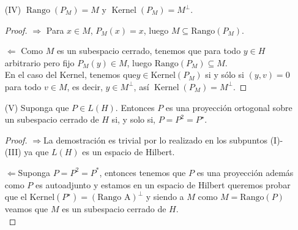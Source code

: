 \begin{itemize}
\begin{proof}
\[
x = P_M(x) + (x - P_M(x)), \quad y = P_M(y) + (y - P_M(y)),
\]
donde \( x - P_M(x) \in M^\perp \) y \( y - P_M(y) \in M^\perp \). Entonces
\begin{align*}
\langle P_M(x), y \rangle 
&= \langle P_M(x), P_M(y) + (y - P_M(y)) \rangle \\
&= \langle P_M(x), P_M(y) \rangle + \langle P_M(x), y - P_M(y) \rangle
\end{align*}
como  \( y - P_M(y) \in M^\perp \) entonces $\langle P_M(x), y - P_M(y) \rangle=0$, luego 

\begin{align*}
\langle P_M(x), P_M(y) \rangle
&= \langle P_M(x)+x-P_M(x), P_M(y)  \rangle \\
&= \langle x, P_M(y) \rangle + \
\end{align*}


Por tanto, \( P_M^* = P_M \), es decir, el operador es autoadjunto.
\end{proof}

\item[(IV)] $\operatorname{Rango}\left(P_M\right)=M$ y $\operatorname{Kernel}\left(P_M\right)=M^{\perp}$.


\begin{proof}
$\Rightarrow$ Para \( x \in M \), \( P_M(x) = x \), luego \( M \subseteq \text{Rango}(P_M) \).

$\Leftarrow$ Como $M$ es un subespacio cerrado, tenemos que para todo $y\in H$ arbitrario pero fijo $P_M(y) \in M$, luego $ \text{Rango}(P_M) \subseteq M$.\\


En el caso del Kernel, tenemos que\( y \in \text{Kernel}(P_M) \) si y sólo si \( (y, v) = 0 \) para todo \( v \in M \), es decir, \( y \in M^\perp \), así $\operatorname{Kernel}\left(P_M\right)=M^{\perp}$.

\end{proof}


\item[(V)] Suponga que $P \in L(H)$. Entonces $P$ es una proyección ortogonal sobre un subespacio cerrado de $H$ si, y solo si, $P=P^2=P^{\star}$. 
\begin{proof}

\(\Rightarrow\)La demostración es trivial por lo realizado en los subpuntos (I)-(III) ya que $L(H)$ es un espacio de Hilbert.

\(\Leftarrow\)Suponga \( P = P^2 = P^* \), entonces tenemos que $P$ es una proyección además como $P$ es autoadjunto y estamos en un espacio de Hilbert  queremos probar que el Kernel$(P^{\star})=(\text{Rango A})^{\perp}$ y siendo a $M$ como \( M = \text{Rango}(P) \) veamos que $M$ es un subespacio cerrado de $H$. \\


\end{proof}
\end{itemize}
